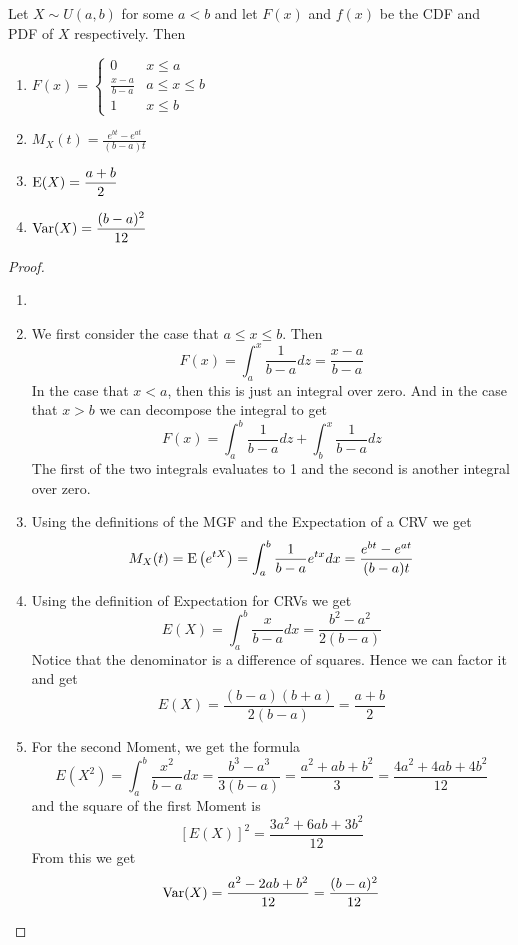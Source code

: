 \documentclass{report}
\begin{document}
\begin{theorem}
    Let $X\sim U(a,b)$ for some $a<b$ and let $F(x)$ and $f(x)$ be the CDF and PDF of $X$ respectively. Then
    \begin{enumerate}
        \item $F(x) = \begin{cases}
            0 & x \le a\\
            \displaystyle\frac{x-a}{b-a} & a\le x \le b\\
            1 & x \le b
        \end{cases}$
        \item $M_X(t)=\displaystyle\frac{e^{bt}-e^{at}}{(b-a)t}$
        \item $\textup{E}(X)=\displaystyle\frac{a+b} 2$
        \item $\textup{Var}(X)=\displaystyle\frac{(b-a)^2}{12}$
    \end{enumerate}
    \begin{proof}
        \begin{enumerate}
            \item[]
            \item We first consider the case that $a\le x\le b$. Then
            \[
                F(x)=\int_a^x \frac 1 {b-a} dz = \frac{x-a}{b-a}
            \]
            In the case that $x<a$, then this is just an integral over zero. And in the case that $x>b$ we can decompose the integral to get
            \[
                F(x)=\int_a^b \frac 1 {b-a} dz + \int_b^x \frac 1 {b-a} dz
            \]
            The first of the two integrals evaluates to 1 and the second is another integral over zero.
            \item Using the definitions of the MGF and the Expectation of a CRV we get
            \[
                M_X(t)=\textup{E}\left(e^{tX}\right)=\int_a^b \frac 1 {b-a} e^{tx} dx=\frac{e^{bt}-e^{at}}{(b-a)t}
            \]
            \item Using the definition of Expectation for CRVs we get
            \[
                E(X)=\int_a^b \frac x {b-a} dx=\frac{b^2-a^2}{2(b-a)}
            \]
            Notice that the denominator is a difference of squares. Hence we can factor it and get
            \[
                E(X)=\frac{(b-a)(b+a)}{2(b-a)}=\frac{a+b} 2
            \]
            \item For the second Moment, we get the formula
            \[
                E(X^2)=\int_a^b \frac {x^2} {b-a} dx=\frac{b^3-a^3}{3(b-a)}=\frac{a^2+ab+b^2} 3 = \frac{4a^2+4ab+4b^2}{12}
            \]
            and the square of the first Moment is 
            \[
                [E(X)]^2 = \frac{3a^2+6ab+3b^2}{12}
            \]
            From this we get
            \[
                \textup{Var}(X)=\frac{a^2-2ab+b^2} {12}= \frac{(b-a)^2} {12}
            \]
        \end{enumerate}
    \end{proof}
\end{theorem}
\end{document}
